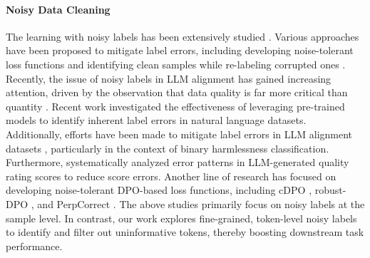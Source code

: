 \paragraph{Noisy Data Cleaning} 
The learning with noisy labels has been extensively studied \citep{vahdat2017toward, veit2017learning, li2017learning, lessbemore, yuan2024early}. Various approaches have been proposed to mitigate label errors, including developing noise-tolerant loss functions \citep{natarajan2013learning, reed2014training, zhu2021second} and identifying clean samples while re-labeling corrupted ones \citep{northcutt2021confident, northcutt2017rankpruning, cheng2021learningsieve, zhu2022detecting}.
Recently, the issue of noisy labels in LLM alignment has gained increasing attention, driven by the observation that data quality is far more critical than quantity \citep{zhou2024lima}. Recent work \citep{chong-etal-2022-detecting} investigated the effectiveness of leveraging pre-trained models to identify inherent label errors in natural language datasets. Additionally, efforts have been made to mitigate label errors in LLM alignment datasets \citep{zhu2024unmasking}, particularly in the context of binary harmlessness classification. Furthermore, \citet{pang2024improving} systematically analyzed error patterns in LLM-generated quality rating scores to reduce score errors. Another line of research has focused on developing noise-tolerant DPO-based loss functions, including cDPO \citep{mitchellnote}, robust-DPO \citep{chowdhury2024provably}, and PerpCorrect \citep{kongperplexity}.
The above studies primarily focus on noisy labels at the sample level. In contrast, our work explores fine-grained, token-level noisy labels to identify and filter out uninformative tokens, thereby boosting downstream task performance.




